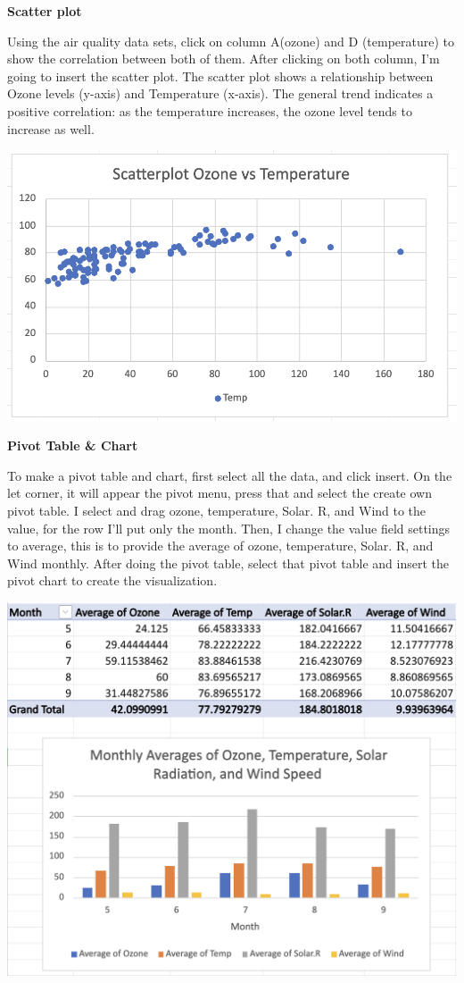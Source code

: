 \documentclass[
  letterpaper,
  DIV=11,
  numbers=noendperiod]{scrreprt}
\begin{document}
\textbf{Scatter plot}

Using the air quality data sets, click on column A(ozone) and D
(temperature) to show the correlation between both of them. After
clicking on both column, I'm going to insert the scatter plot. The
scatter plot shows a relationship between Ozone levels (y-axis) and
Temperature (x-axis). The general trend indicates a positive
correlation: as the temperature increases, the ozone level tends to
increase as well.

\includegraphics{./scatterplotozone.png}

\textbf{Pivot Table \& Chart}

To make a pivot table and chart, first select all the data, and click
insert. On the let corner, it will appear the pivot menu, press that and
select the create own pivot table. I select and drag ozone, temperature,
Solar. R, and Wind to the value, for the row I'll put only the month.
Then, I change the value field settings to average, this is to provide
the average of ozone, temperature, Solar. R, and Wind monthly. After
doing the pivot table, select that pivot table and insert the pivot
chart to create the visualization.

\includegraphics{./pivot1.png}
\end{document}
